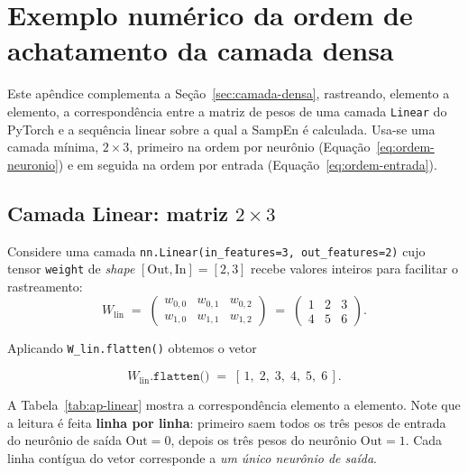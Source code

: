 
\chapter{Exemplo numérico da ordem de achatamento da camada densa}
\label{ap:exemplo-numerico}

Este apêndice complementa a Seção~\ref{sec:camada-densa}, rastreando,
elemento a elemento, a correspondência entre a matriz de pesos de uma camada
\texttt{Linear} do PyTorch e a sequência linear sobre a qual a SampEn é
calculada. Usa-se uma camada mínima, $2 \times 3$, primeiro na ordem por
neurônio (Equação~\ref{eq:ordem-neuronio}) e em seguida na ordem por entrada
(Equação~\ref{eq:ordem-entrada}).

\section{Camada Linear: matriz \texorpdfstring{$2 \times 3$}{2x3}}
\label{sec:ap-linear}

Considere uma camada \texttt{nn.Linear(in\_features=3, out\_features=2)}
cujo tensor \texttt{weight} de \emph{shape} $[\mathrm{Out}, \mathrm{In}] = [2, 3]$
recebe valores inteiros para facilitar o rastreamento:
\begin{equation}
  W_{\text{lin}} \;=\;
  \begin{pmatrix}
    w_{0,0} & w_{0,1} & w_{0,2} \\
    w_{1,0} & w_{1,1} & w_{1,2}
  \end{pmatrix}
  \;=\;
  \begin{pmatrix}
    1 & 2 & 3 \\
    4 & 5 & 6
  \end{pmatrix}.
\end{equation}

Aplicando \texttt{W\_lin.flatten()} obtemos o vetor

\begin{equation}
  W_{\text{lin}}.\texttt{flatten()} \;=\; [\,1,\;2,\;3,\;4,\;5,\;6\,].
\end{equation}

A Tabela~\ref{tab:ap-linear} mostra a correspondência elemento a elemento.
Note que a leitura é feita \textbf{linha por linha}: primeiro saem todos os
três pesos de entrada do neurônio de saída $\mathrm{Out}=0$, depois os três
pesos do neurônio $\mathrm{Out}=1$. Cada linha contígua do vetor
corresponde a \emph{um único neurônio de saída}.

